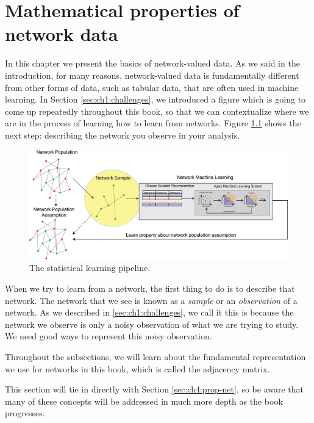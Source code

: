 \chapter{Mathematical properties of network data}
\label{sec:ch4}


In this chapter we present the basics of network-valued data. As we said in the introduction, for many reasons, network-valued data is fundamentally different from other forms of data, such as tabular data, that are often used in machine learning. In Section \ref{sec:ch1:challenges}, we introduced a figure which is going to come up repeatedly throughout this book, so that we can contextualize where we are in the process of learning {how to learn} from networks. Figure \ref{fig:ch4:rep_properties} shows the next step: describing the network you observe in  your analysis.

\begin{figure}[h]
    \centering
    \includegraphics[width=\linewidth]{representations/ch4/Images/network_reps.png}
    \caption[Describing networks schematic]{The statistical learning pipeline.}
    \label{fig:ch4:rep_properties}
\end{figure}

When we try to learn from a network, the first thing to do is to describe that network. The network that we see is known as a \emph{sample} or an \emph{observation} of a network. As we described in \ref{sec:ch1:challenges}, we call it this is because the network we observe is only a noisy observation of what we are trying to study. We need good ways to represent this noisy observation.

Throughout the subsections, we will learn about the fundamental representation we use for networks in this book, which is called the adjacency matrix.

This section will tie in directly with Section \ref{sec:ch4:prop-net}, so be aware that many of these concepts will be addressed in much more depth as the book progresses.

\newpage 







